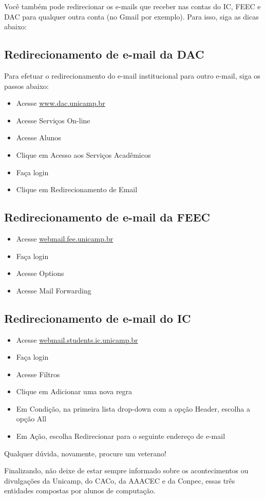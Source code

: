 Você também pode redirecionar os e-mails que receber nas contas do IC, FEEC
e DAC para qualquer outra conta (no Gmail por exemplo). Para isso, siga as dicas
abaixo:

\subsection{Redirecionamento de e-mail da DAC}

Para efetuar o redirecionamento do e-mail institucional para outro e-mail, siga
os passos abaixo:

\begin{itemize}
\item  Acesse \url{www.dac.unicamp.br}
\item  Acesse Serviços On-line
\item  Acesse Alunos
\item  Clique em Acesso aos Serviços Acadêmicos
\item  Faça login
\item  Clique em Redirecionamento de Email
\end{itemize}

\subsection{Redirecionamento de e-mail da FEEC}

\begin{itemize}
\item  Acesse \url{webmail.fee.unicamp.br}
\item  Faça login
\item  Acesse Options
\item  Acesse Mail Forwarding
\end{itemize}

\subsection{Redirecionamento de e-mail do IC}

\begin{itemize}
\item  Acesse \url{webmail.students.ic.unicamp.br}
\item  Faça login
\item  Acesse Filtros
\item  Clique em Adicionar uma nova regra
\item  Em Condição, na primeira lista drop-down com a opção Header, escolha a opção All
\item  Em Ação, escolha Redirecionar para o seguinte endereço de e-mail
\end{itemize}

Qualquer dúvida, novamente, procure um veterano!

Finalizando, não deixe de estar sempre informado sobre os acontecimentos ou
divulgações da Unicamp, do CACo, da AAACEC e da Conpec, essas três entidades
compostas por alunos de computação.

